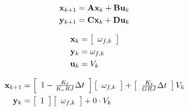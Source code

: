\begin{align*}
  \mathbf{x}_{k+1} &= \mathbf{A} \mathbf{x}_k + \mathbf{B} \mathbf{u}_k \\
  \mathbf{y}_{k+1} &= \mathbf{C} \mathbf{x}_k + \mathbf{D} \mathbf{u}_k
\end{align*}

\begin{align*}
  \mathbf{x}_k &= \left[
  \begin{array}{c}
    \omega_{f,k}
  \end{array}
  \right] \\
  \mathbf{y}_k &= \omega_{f,k} \\
  \mathbf{u}_k &= V_k
\end{align*}

\begin{align}
  \mathbf{x}_{k+1} &= \left[
  \begin{array}{c}
    1 - \frac{K_t}{K_v RJ} \Delta t
  \end{array}
  \right] \left[
  \begin{array}{c}
    \omega_{f,k} \\
  \end{array}
  \right] + \left[
  \begin{array}{c}
    \frac{K_t}{GRJ} \Delta t
  \end{array}
  \right] V_k \\
  \mathbf{y}_k &= \left[
  \begin{array}{c}
    1
  \end{array}
  \right] \left[
  \begin{array}{c}
    \omega_{f,k} \\
  \end{array}
  \right] + 0 \cdot V_k
\end{align}

